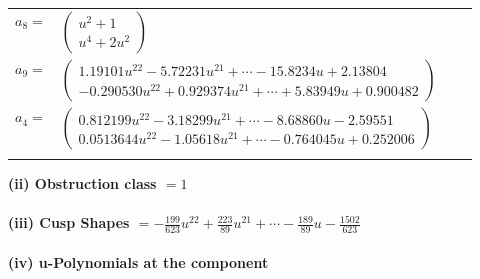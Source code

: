 \documentclass[1p]{elsarticle_modified}
\theoremstyle{definition}
\begin{document}
\begin{tabular}{m{7pt} m{180pt} m{7pt} m{180pt} }
\flushright $a_{8}=$&$\begin{pmatrix}u^2+1\\u^4+2 u^2\end{pmatrix}$ \\
\flushright $a_{9}=$&$\begin{pmatrix}1.19101 u^{22}-5.72231 u^{21}+\cdots-15.8234 u+2.13804\\-0.290530 u^{22}+0.929374 u^{21}+\cdots+5.83949 u+0.900482\end{pmatrix}$ \\
\flushright $a_{4}=$&$\begin{pmatrix}0.812199 u^{22}-3.18299 u^{21}+\cdots-8.68860 u-2.59551\\0.0513644 u^{22}-1.05618 u^{21}+\cdots-0.764045 u+0.252006\end{pmatrix}$\\&\end{tabular}
\flushleft \textbf{(ii) Obstruction class $= 1$}\\~\\
\flushleft \textbf{(iii) Cusp Shapes $= -\frac{199}{623} u^{22}+\frac{223}{89} u^{21}+\cdots-\frac{189}{89} u-\frac{1502}{623}$}\\~\\
\newpage\renewcommand{\arraystretch}{1}
\flushleft \textbf{(iv) u-Polynomials at the component}\newline \\
\end{document}
